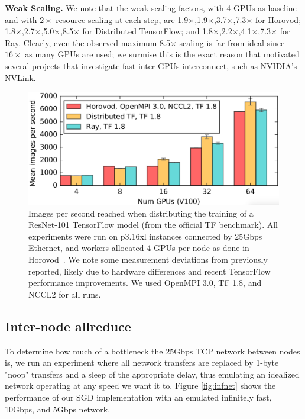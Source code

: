 {\bf Weak Scaling.}  We note that the weak scaling factors, with 4 GPUs as baseline and with $2\times$ resource scaling at each step, are 1.9$\times$,1.9$\times$,3.7$\times$,7.3$\times$ for Horovod;
1.8$\times$,2.7$\times$,5.0$\times$,8.5$\times$ for Distributed TensorFlow;
and
1.8$\times$,2.2$\times$,4.1$\times$,7.3$\times$ for Ray.  Clearly, even the observed maximum 8.5$\times$ scaling  is far from ideal since $16\times$ as many GPUs are used; we surmise this is the exact reason that motivated several projects that investigate fast inter-GPUs interconnect, such as  NVIDIA's NVLink.

\begin{figure}[tb]
    \centering
    \includegraphics[width=5.1in,keepaspectratio]{fig/sgd.png}
    \caption{
    \small{
        Images per second reached when distributing the training of a
        ResNet-101 TensorFlow model (from the official TF benchmark).
        All experiments were run on p3.16xl instances connected by 25Gbps Ethernet, and
        workers allocated 4 GPUs per node as done in Horovod~\cite{horovod}.
        We note some measurement deviations from previously reported, likely
        due to hardware differences and
        recent TensorFlow performance improvements. We used
        OpenMPI 3.0, TF 1.8, and NCCL2 for all runs.
    }
    }
    \label{fig:sgd}
\end{figure}

\subsection{Inter-node allreduce}
To determine how much of a bottleneck the 25Gbps TCP network between nodes is, we run an experiment where all network transfers are replaced by 1-byte "noop" transfers and a sleep of the appropriate delay, thus emulating an idealized network operating at any speed we want it to. Figure \ref{fig:infnet} shows the performance of our SGD implementation with an emulated infinitely fast, 10Gbps, and 5Gbps network.

